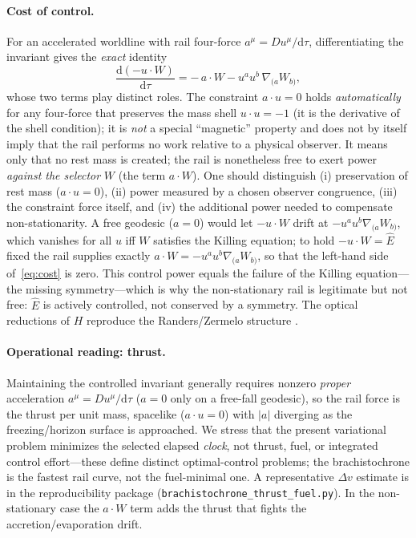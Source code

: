 \documentclass[12pt]{iopart}
\newcommand{\Ehat}{\hat E}
\newcommand{\dd}{\mathrm{d}}
\begin{document}
\paragraph{Cost of control.} For an accelerated worldline with rail four-force
$a^\mu=Du^\mu/\dd\tau$, differentiating the invariant gives the \emph{exact}
identity
\begin{equation}
    \frac{\dd(-u\cdot W)}{\dd\tau}=-\,a\cdot W-u^a u^b\,\nabla_{(a}W_{b)},
    \label{eq:cost}
\end{equation}
whose two terms play distinct roles. The constraint $a\cdot u=0$ holds
\emph{automatically} for any four-force that preserves the mass shell
$u\cdot u=-1$ (it is the derivative of the shell condition); it is \emph{not} a
special ``magnetic'' property and does not by itself imply that the rail performs no
work relative to a physical observer. It means only that no rest mass is created;
the rail is nonetheless free to exert power \emph{against the selector} $W$ (the term
$a\cdot W$). One should distinguish (i) preservation of rest mass ($a\cdot u=0$),
(ii) power measured by a chosen observer congruence, (iii) the constraint force
itself, and (iv) the additional power needed to compensate non-stationarity.
A free geodesic ($a=0$) would let $-u\cdot W$ drift at $-u^au^b\nabla_{(a}W_{b)}$,
which vanishes for all $u$ iff $W$ satisfies the Killing equation; to hold
$-u\cdot W=\Ehat$ fixed the rail supplies exactly $a\cdot W=-u^au^b\nabla_{(a}W_{b)}$,
so that the left-hand side of~\eqref{eq:cost} is zero. This control power equals the
failure of the Killing equation---the missing symmetry---which is why the
non-stationary rail is legitimate but not free: $\Ehat$ is actively controlled, not
conserved by a symmetry. The optical reductions of $H$
reproduce the Randers/Zermelo structure
\cite{GibbonsRanders2009,CaponioWind}.

\paragraph{Operational reading: thrust.} Maintaining the controlled invariant generally
requires nonzero \emph{proper} acceleration $a^\mu=Du^\mu/\dd\tau$ ($a=0$ only on a
free-fall geodesic), so the rail force is the thrust per unit mass, spacelike
($a\cdot u=0$) with $|a|$ diverging as the freezing/horizon surface is approached. We
stress that the present variational problem minimizes the selected elapsed \emph{clock},
not thrust, fuel, or integrated control effort---these define distinct optimal-control
problems; the brachistochrone is the fastest rail curve, not the fuel-minimal one. A
representative $\Delta v$ estimate is in the reproducibility package
(\texttt{brachistochrone\_thrust\_fuel.py}). In the non-stationary case the $a\cdot W$
term adds the thrust that fights the accretion/evaporation drift.
\end{document}
